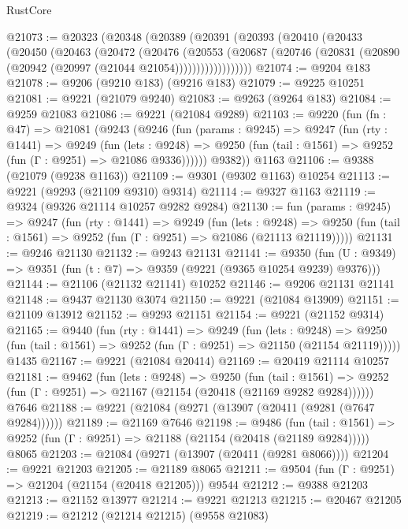 \begin{lexlean}{RustCore}
\begin{coremodule}
@21073 := @20323
    (@20348
      (@20389
        (@20391
          (@20393
            (@20410
              (@20433
                (@20450
                  (@20463
                    (@20472
                      (@20476
                        (@20553
                          (@20687
                            (@20746 (@20831 (@20890 (@20942 (@20997 (@21044 @21054))))))))))))))))))
@21074 := @9204 @183
@21078 := @9206 (@9210 @183) (@9216 @183)
@21079 := @9225 @10251
@21081 := @9221 (@21079 @9240)
@21083 := @9263 (@9264 @183)
@21084 := @9259 @21083
@21086 := @9221 (@21084 @9289)
@21103 := @9220
    (fun (fn : @47) =>
    @21081
      (@9243
        (@9246
          (fun (params : @9245) =>
          @9247
            (fun (rty : @1441) =>
            @9249
              (fun (lets : @9248) =>
              @9250 (fun (tail : @1561) => @9252 (fun (Γ : @9251) => @21086 @9336))))))
        @9382))
    @1163
@21106 := @9388 (@21079 (@9238 @1163))
@21109 := @9301 (@9302 @1163) @10254
@21113 := @9221 (@9293 (@21109 @9310) @9314)
@21114 := @9327 @1163
@21119 := @9324 (@9326 @21114 @10257 @9282 @9284)
@21130 := fun (params : @9245) =>
  @9247
    (fun (rty : @1441) =>
    @9249
      (fun (lets : @9248) =>
      @9250 (fun (tail : @1561) => @9252 (fun (Γ : @9251) => @21086 (@21113 @21119)))))
@21131 := @9246 @21130
@21132 := @9243 @21131
@21141 := @9350
    (fun (U : @9349) => @9351 (fun (t : @7) => @9359 (@9221 (@9365 @10254 @9239) @9376)))
@21144 := @21106 (@21132 @21141) @10252
@21146 := @9206 @21131 @21141
@21148 := @9437 @21130 @3074
@21150 := @9221 (@21084 @13909)
@21151 := @21109 @13912
@21152 := @9293 @21151
@21154 := @9221 (@21152 @9314)
@21165 := @9440
    (fun (rty : @1441) =>
    @9249
      (fun (lets : @9248) =>
      @9250 (fun (tail : @1561) => @9252 (fun (Γ : @9251) => @21150 (@21154 @21119)))))
    @1435
@21167 := @9221 (@21084 @20414)
@21169 := @20419 @21114 @10257
@21181 := @9462
    (fun (lets : @9248) =>
    @9250
      (fun (tail : @1561) =>
      @9252 (fun (Γ : @9251) => @21167 (@21154 (@20418 (@21169 @9282 @9284))))))
    @7646
@21188 := @9221 (@21084 (@9271 (@13907 (@20411 (@9281 (@7647 @9284))))))
@21189 := @21169 @7646
@21198 := @9486
    (fun (tail : @1561) => @9252 (fun (Γ : @9251) => @21188 (@21154 (@20418 (@21189 @9284)))))
    @8065
@21203 := @21084 (@9271 (@13907 (@20411 (@9281 @8066))))
@21204 := @9221 @21203
@21205 := @21189 @8065
@21211 := @9504 (fun (Γ : @9251) => @21204 (@21154 (@20418 @21205))) @9544
@21212 := @9388 @21203
@21213 := @21152 @13977
@21214 := @9221 @21213
@21215 := @20467 @21205
@21219 := @21212 (@21214 @21215) (@9558 @21083)

\end{coremodule}
\end{lexlean}
